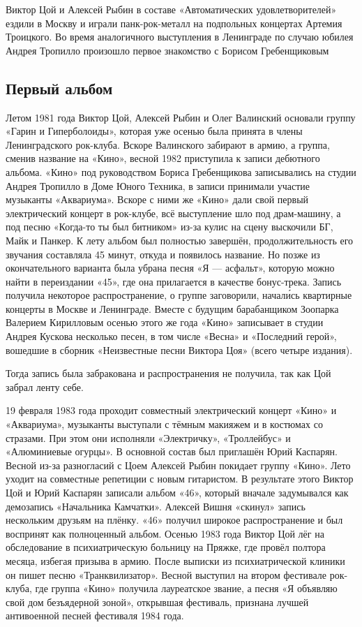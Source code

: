 Виктор Цой и Алексей Рыбин в составе «Автоматических удовлетворителей» ездили в Москву и играли панк-рок-металл на подпольных концертах Артемия Троицкого. Во время аналогичного выступления в Ленинграде по случаю юбилея Андрея Тропилло произошло первое знакомство с Борисом Гребенщиковым

\subsection{Первый альбом}
Летом 1981 года Виктор Цой, Алексей Рыбин и Олег Валинский основали группу «Гарин и Гиперболоиды», которая уже осенью была принята в члены Ленинградского рок-клуба. Вскоре Валинского забирают в армию, а группа, сменив название на «Кино», весной 1982 приступила к записи дебютного альбома. «Кино» под руководством Бориса Гребенщикова записывались на студии Андрея Тропилло в Доме Юного Техника, в записи принимали участие музыканты «Аквариума». Вскоре с ними же «Кино» дали свой первый электрический концерт в рок-клубе, всё выступление шло под драм-машину, а под песню «Когда-то ты был битником» из-за кулис на сцену выскочили БГ, Майк и Панкер. К лету альбом был полностью завершён, продолжительность его звучания составляла 45 минут, откуда и появилось название. Но позже из окончательного варианта была убрана песня «Я --- асфальт», которую можно найти в переиздании «45», где она прилагается в качестве бонус-трека. Запись получила некоторое распространение, о группе заговорили, начал\'{и}сь квартирные концерты в Москве и Ленинграде. Вместе с будущим барабанщиком Зоопарка Валерием Кирилловым осенью этого же года «Кино» записывает в студии Андрея Кускова несколько песен, в том числе «Весна» и «Последний герой», вошедшие в сборник «Неизвестные песни Виктора Цоя» (всего четыре издания).

Тогда запись была забракована и распространения не получила, так как Цой забрал ленту себе.

19 февраля 1983 года проходит совместный электрический концерт «Кино» и «Аквариума», музыканты выступали с тёмным макияжем и в костюмах со стразами. При этом они исполняли «Электричку», «Троллейбус» и «Алюминиевые огурцы». В основной состав был приглашён Юрий Каспарян. Весной из-за разногласий с Цоем Алексей Рыбин покидает группу «Кино». Лето уходит на совместные репетиции с новым гитаристом. В результате этого Виктор Цой и Юрий Каспарян записали альбом «46», который вначале задумывался как демозапись «Начальника Камчатки». Алексей Вишня «скинул» запись нескольким друзьям на плёнку. «46» получил широкое распространение и был воспринят как полноценный альбом. Осенью 1983 года Виктор Цой лёг на обследование в психиатрическую больницу на Пряжке, где провёл полтора месяца, избегая призыва в армию. После выписки из психиатрической клиники он пишет песню «Транквилизатор». Весной выступил на втором фестивале рок-клуба, где группа «Кино» получила лауреатское звание, а песня «Я объявляю свой дом безъядерной зоной», открывшая фестиваль, признана лучшей антивоенной песней фестиваля 1984 года.



